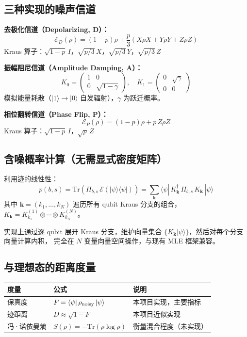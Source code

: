 \documentclass[12pt, a4paper]{article}
\begin{document}
\subsection{三种实现的噪声信道}

\textbf{去极化信道（Depolarizing, D）：}
\[
    \mathcal{E}_D(\rho) = (1-p)\rho
    + \frac{p}{3}(X\rho X + Y\rho Y + Z\rho Z)
\]
Kraus 算子：$\sqrt{1-p}\,I$，$\sqrt{p/3}\,X$，$\sqrt{p/3}\,Y$，$\sqrt{p/3}\,Z$

\bigskip
\textbf{振幅阻尼信道（Amplitude Damping, A）：}
\[
    K_0 = \begin{pmatrix}1&0\\0&\sqrt{1-\gamma}\end{pmatrix},
    \quad
    K_1 = \begin{pmatrix}0&\sqrt{\gamma}\\0&0\end{pmatrix}
\]
模拟能量耗散（$|1\rangle \to |0\rangle$ 自发辐射），$\gamma$ 为跃迁概率。

\bigskip
\textbf{相位翻转信道（Phase Flip, P）：}
\[
    \mathcal{E}_P(\rho) = (1-p)\rho + p\,Z\rho Z
\]
Kraus 算子：$\sqrt{1-p}\,I$，$\sqrt{p}\,Z$

\subsection{含噪概率计算（无需显式密度矩阵）}

利用迹的线性性：
\[
    p(b,s) = \mathrm{Tr}\!\left(\Pi_{b,s}\,\mathcal{E}(|\psi\rangle\langle\psi|)\right)
    = \sum_{\mathbf{k}} \langle\psi|\,K_{\mathbf{k}}^\dagger\,\Pi_{b,s}\,K_{\mathbf{k}}\,|\psi\rangle
\]
其中 $\mathbf{k} = (k_1,\ldots,k_N)$ 遍历所有 qubit Kraus 分支的组合，
$K_{\mathbf{k}} = K_{k_1}^{(1)} \otimes \cdots \otimes K_{k_N}^{(N)}$。

实现上通过逐 qubit 展开 Kraus 分支，维护向量集合
$\{K_{\mathbf{k}}|\psi\rangle\}$，然后对每个分支向量计算内积，
完全在 $N$ 变量向量空间操作，与现有 MLE 框架兼容。

\subsection{与理想态的距离度量}

\begin{center}
\begin{tabular}{lll}
\toprule
度量 & 公式 & 说明 \\
\midrule
保真度 & $F = \bra{\psi}\rho_{\text{noisy}}\ket{\psi}$ & 本项目实现，主要指标 \\
迹距离 & $D \approx \sqrt{1-F}$ & 本项目近似实现 \\
冯·诺依曼熵 & $S(\rho) = -\mathrm{Tr}(\rho\log\rho)$ & 衡量混合程度（未实现）\\
\bottomrule
\end{tabular}
\end{center}
\end{document}

